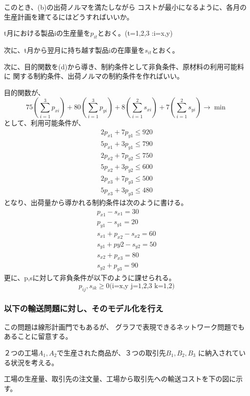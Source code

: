 \documentclass[9pt]{ltjsreport}
\begin{document}
このとき、(b)の出荷ノルマを満たしながら
コストが最小になるように、各月の生産計画を建てるにはどうすればいいか。

\hrulefill

t月における製品iの生産量を$p_{it}$とおく。(t=1,2,3 :i=x,y)

次に、t月から翌月に持ち越す製品iの在庫量を$s_{it}$とおく。

次に、目的関数を(d)から導き、制約条件として非負条件、原材料の利用可能料に
関する制約条件、出荷ノルマの制約条件を作ればいい。

目的関数が、
\begin{equation*}
    75(\sum_{i=1}^3 p_{xi})
    +80(\sum_{i=1}^3 p_{yi})
    +8(\sum_{i=1}^2 s_{xi})
    +7(\sum_{i=1}^2 s_{yi})
    \longrightarrow \min
\end{equation*}
として、利用可能条件が、
\begin{gather*}
    2p_{x1}+7p_{y1}\le 920\\
    5p_{x1}+3p_{y1}\le 790\\
    2p_{x2}+7p_{y2}\le 750\\
    5p_{x2}+3p_{y2}\le 600\\
    2p_{x3}+7p_{y3}\le 500\\
    5p_{x3}+3p_{y3}\le 480
\end{gather*}
となり、出荷量から導かれる制約条件は次のように書ける。
\begin{gather*}
    p_{x1}-s_{x1}=30\\
    p_{y1}-s_{y1}=20\\
    s_{x1}+p_{x2}-s_{x2}=60\\
    s_{y1}+p{y2}-s_{y2}=50\\
    s_{x2}+p_{x3}=80\\
    s_{y2}+p_{y3}=90
\end{gather*}
更に、p,sに対して非負条件が以下のように課せられる。
\begin{equation*}
    p_{ij},s_{ik}\ge 0 \text{(i=x,y  j=1,2,3 k=1,2)}
\end{equation*}
\newpage
\subsubsection{以下の輸送問題に対し、そのモデル化を行え}
この問題は線形計画門でもあるが、
グラフで表現できるネットワーク問題でもあることに留意する。

２つの工場$A_1,A_2$で生産された商品が、３つの取引先$B_1,B_2,B_3$
に納入されている状況を考える。

工場の生産量、取引先の注文量、工場から取引先への輸送コストを下の図に示す。
\end{document}
